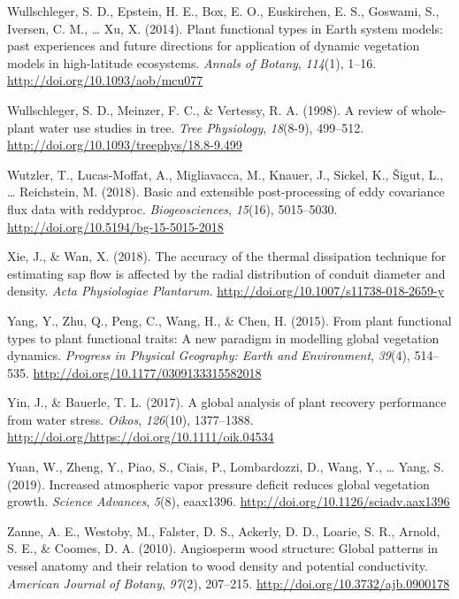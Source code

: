 \documentclass[11pt,twoside]{reedthesis}
\begin{document}
\hypertarget{ref-Wullschleger2014}{}
Wullschleger, S. D., Epstein, H. E., Box, E. O., Euskirchen, E. S.,
Goswami, S., Iversen, C. M., \ldots{} Xu, X. (2014). Plant functional
types in Earth system models: past experiences and future directions for
application of dynamic vegetation models in high-latitude ecosystems.
\emph{Annals of Botany}, \emph{114}(1), 1--16.
\url{http://doi.org/10.1093/aob/mcu077}

\hypertarget{ref-Wullschleger1998}{}
Wullschleger, S. D., Meinzer, F. C., \& Vertessy, R. A. (1998). A review
of whole-plant water use studies in tree. \emph{Tree Physiology},
\emph{18}(8-9), 499--512.
\url{http://doi.org/10.1093/treephys/18.8-9.499}

\hypertarget{ref-Wutzler2018}{}
Wutzler, T., Lucas-Moffat, A., Migliavacca, M., Knauer, J., Sickel, K.,
Šigut, L., \ldots{} Reichstein, M. (2018). Basic and extensible
post-processing of eddy covariance flux data with reddyproc.
\emph{Biogeosciences}, \emph{15}(16), 5015--5030.
\url{http://doi.org/10.5194/bg-15-5015-2018}

\hypertarget{ref-Xie2018}{}
Xie, J., \& Wan, X. (2018). The accuracy of the thermal dissipation
technique for estimating sap flow is affected by the radial distribution
of conduit diameter and density. \emph{Acta Physiologiae Plantarum}.
\url{http://doi.org/10.1007/s11738-018-2659-y}

\hypertarget{ref-Yang2015}{}
Yang, Y., Zhu, Q., Peng, C., Wang, H., \& Chen, H. (2015). From plant
functional types to plant functional traits: A new paradigm in modelling
global vegetation dynamics. \emph{Progress in Physical Geography: Earth
and Environment}, \emph{39}(4), 514--535.
\url{http://doi.org/10.1177/0309133315582018}

\hypertarget{ref-Yin2017}{}
Yin, J., \& Bauerle, T. L. (2017). A global analysis of plant recovery
performance from water stress. \emph{Oikos}, \emph{126}(10), 1377--1388.
\url{http://doi.org/https://doi.org/10.1111/oik.04534}

\hypertarget{ref-yuan_increased_2019}{}
Yuan, W., Zheng, Y., Piao, S., Ciais, P., Lombardozzi, D., Wang, Y.,
\ldots{} Yang, S. (2019). Increased atmospheric vapor pressure deficit
reduces global vegetation growth. \emph{Science Advances}, \emph{5}(8),
eaax1396. \url{http://doi.org/10.1126/sciadv.aax1396}

\hypertarget{ref-Zanne2010}{}
Zanne, A. E., Westoby, M., Falster, D. S., Ackerly, D. D., Loarie, S.
R., Arnold, S. E., \& Coomes, D. A. (2010). Angiosperm wood structure:
Global patterns in vessel anatomy and their relation to wood density and
potential conductivity. \emph{American Journal of Botany}, \emph{97}(2),
207--215. \url{http://doi.org/10.3732/ajb.0900178}
\end{document}
